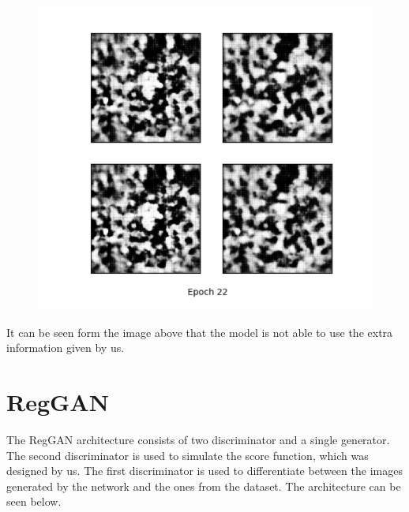 \documentclass[12pt]{report}
\begin{document}
\begin{figure}[H]
	\centering
\includegraphics[scale=0.5]{cdcgan_result}
\end{figure}

It can be seen form the image above that the model is not able to use the extra information given by us.

\chapter*{RegGAN}

The RegGAN architecture consists of two discriminator and a single generator. The second discriminator is used to simulate the score function, which was designed by us. The first discriminator is used to differentiate between the images generated by the network and the ones from the dataset. The architecture can be seen below.
\end{document}
